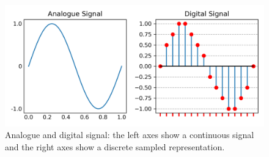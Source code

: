 \begin{figure}
    \centering
    \includegraphics[width=1\linewidth]{analogue_digital}
    \caption[Analogue and digital signals]{Analogue and digital signal: the left axes show a continuous signal and the right axes show a discrete sampled representation.}
    \label{fig:analogue-digital-signal}
\end{figure}

